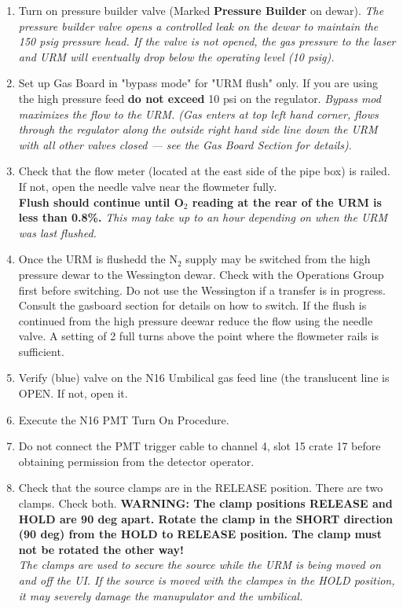 \begin{enumerate}
\begin{center}
\end{center}
\item \CheckBox[name=n16p13]{} Turn on pressure builder valve (Marked {\bf Pressure Builder} on dewar). {\it The pressure builder valve opens a controlled leak on the dewar to maintain the 150 psig pressure head. If the valve is not opened, the gas pressure to the laser and URM will eventually drop below the operating level (10 psig).}
\item \CheckBox[name=n16p14]{} Set up Gas Board in "bypass mode" for "URM flush" only. If you are using the high pressure feed {\bf do not exceed} 10 psi on the regulator. {\it Bypass mod maximizes the flow to the URM. (Gas enters at top left hand corner, flows through the regulator along the outside right hand side line down the URM with all other valves closed --- see the Gas Board Section for details)}.
\item \CheckBox[name=n16p15]{} Check that the flow meter (located at the east side of the pipe box) is railed. If not, open the needle valve near the flowmeter fully.\\ {\bf Flush should continue until O$_{2}$ reading at the rear of the URM is less than 0.8\%.} {\it This may take up to an hour depending on when the URM was last flushed.}
\item \CheckBox[name=n16p16]{} Once the URM is flushedd the N$_{2}$ supply may be switched from the high pressure dewar to the Wessington dewar. Check with the Operations Group first before switching. Do not use the Wessington if a transfer is in progress. Consult the gasboard section for details on how to switch. If the flush is continued from the high pressure deewar reduce the flow using the needle valve. A setting of 2 full turns above the point where the flowmeter rails is sufficient.
\item \CheckBox[name=n16p17]{} Verify (blue) valve on the N16 Umbilical gas feed line (the translucent line is OPEN. If not, open it.
\item \CheckBox[name=n16p18]{} Execute the N16 PMT Turn On Procedure.
\item \CheckBox[name=n16p19]{} Do not connect the PMT trigger cable to channel 4, slot 15 crate 17 before obtaining permission from the detector operator.
\item \CheckBox[name=n16p20]{} Check that the source clamps are in the RELEASE position. There are two clamps. Check both. {\bf WARNING: The clamp positions RELEASE and HOLD are 90 deg apart. Rotate the clamp in the SHORT direction (90 deg) from the HOLD to RELEASE position. The clamp must not be rotated the other way!}\\ {\it The clamps are used to secure the source while the URM is being moved on and off the UI. If the source is moved with the clampes in the HOLD position, it may severely damage the manupulator and the umbilical.}

\end{enumerate}

